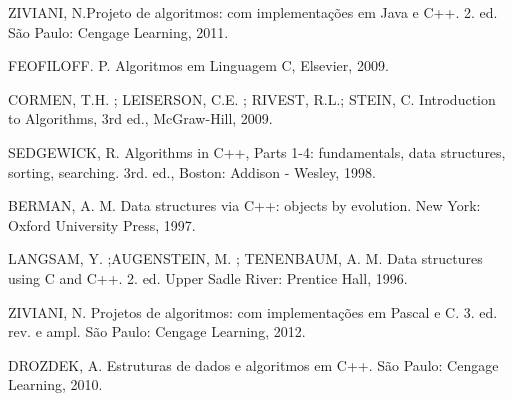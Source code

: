 {{        ZIVIANI, N.Projeto de algoritmos: com implementações em Java e C++. 2. ed. São Paulo: Cengage Learning, 2011.

        FEOFILOFF. P. Algoritmos em Linguagem C, Elsevier, 2009.

        CORMEN, T.H. ; LEISERSON, C.E. ; RIVEST, R.L.; STEIN, C. Introduction to Algorithms, 3rd ed., McGraw-Hill, 2009.
    }{
        SEDGEWICK,  R. Algorithms in C++, Parts 1-4: fundamentals, data structures, sorting, searching. 3rd. ed., Boston: Addison - Wesley, 1998.

        BERMAN,  A. M. Data structures via C++: objects by evolution. New York: Oxford University Press, 1997.

        LANGSAM, Y. ;AUGENSTEIN, M. ; TENENBAUM, A. M. Data structures using C and C++. 2. ed. Upper Sadle River: Prentice Hall, 1996.

        ZIVIANI,  N. Projetos de algoritmos: com implementações em Pascal e C. 3. ed. rev. e ampl. São Paulo: Cengage Learning, 2012.

        DROZDEK,  A. Estruturas de dados e algoritmos em C++. São Paulo: Cengage Learning, 2010.
    }
}